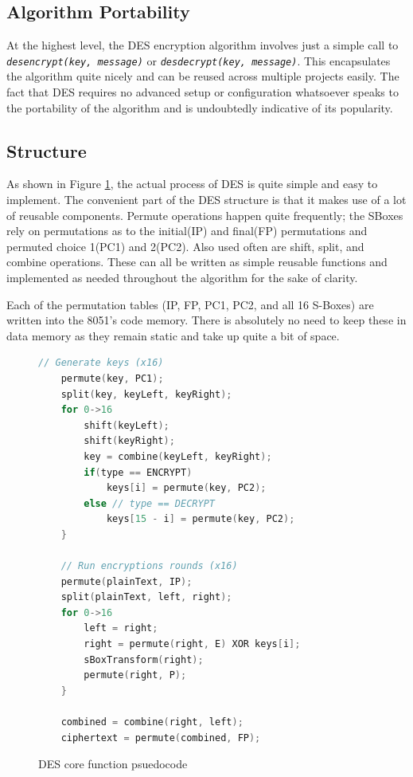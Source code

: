 \documentclass[conference]{IEEEtran}
\begin{document}
\subsection{Algorithm Portability}
At the highest level, the DES encryption algorithm involves just a simple call to \texttt{\textit{des\textunderscore encrypt(key, message)}} or \texttt{\textit{des\textunderscore decrypt(key, message)}}. This encapsulates the algorithm quite nicely and can be reused across multiple projects easily. The fact that DES requires no advanced setup or configuration whatsoever speaks to the portability of the algorithm and is undoubtedly indicative of its popularity.

\subsection{Structure}
As shown in Figure \ref{fig:psuedo}, the actual process of DES is quite simple and easy to implement. The convenient part of the DES structure is that it makes use of a lot of reusable components. Permute operations happen quite frequently; the SBoxes rely on permutations as to the initial(IP) and final(FP) permutations and permuted choice 1(PC1) and 2(PC2). Also used often are shift, split, and combine operations. These can all be written as simple reusable functions and implemented as needed throughout the algorithm for the sake of clarity.

Each of the permutation tables (IP, FP, PC1, PC2, and all 16 S-Boxes) are written into the 8051's code memory. There is absolutely no need to keep these in data memory as they remain static and take up quite a bit of space.

\begin{figure}[ht]
  \centering
  \begin{lstlisting}[language=C,frame=single,tabsize=3,breaklines=true,basicstyle=\small]
	// Generate keys (x16)
	permute(key, PC1);
	split(key, keyLeft, keyRight);
	for 0->16
		shift(keyLeft);
		shift(keyRight);
		key = combine(keyLeft, keyRight);
		if(type == ENCRYPT)
			keys[i] = permute(key, PC2);
		else // type == DECRYPT
			keys[15 - i] = permute(key, PC2);
	}
	
	// Run encryptions rounds (x16)
	permute(plainText, IP);
	split(plainText, left, right);
	for 0->16
		left = right;
		right = permute(right, E) XOR keys[i];
		sBoxTransform(right);
		permute(right, P);
	}
	
	combined = combine(right, left);
	ciphertext = permute(combined, FP);
  \end{lstlisting}
  \caption{DES core function psuedocode}
  \label{fig:psuedo}
\end{figure}
\end{document}
